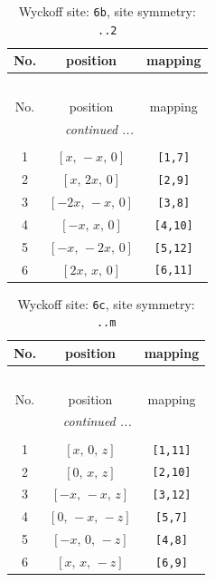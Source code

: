 \documentclass[fleqn,8pt]{jsarticle}
\begin{document}
\begin{longtable}{ccc}
\caption{Wyckoff site: {\tt 6b}, site symmetry: {\tt ..2}}
 \\
 \hline \hline
No. & position & mapping \\ \hline \endfirsthead

\multicolumn{2}{l}{\tablename\ \thetable{}} \\
 \hline \hline
No. & position & mapping \\ \hline \endhead

 \hline \hline
\multicolumn{2}{r}{\footnotesize\it continued ...} \\ \endfoot

 \hline \hline
\multicolumn{2}{r}{} \\ \endlastfoot

1 & $\left[ x,\, - x,\, 0 \right]$ & {\tt [1,7]} \\ \hline
2 & $\left[ x,\, 2 x,\, 0 \right]$ & {\tt [2,9]} \\ \hline
3 & $\left[ - 2 x,\, - x,\, 0 \right]$ & {\tt [3,8]} \\ \hline
4 & $\left[ - x,\, x,\, 0 \right]$ & {\tt [4,10]} \\ \hline
5 & $\left[ - x,\, - 2 x,\, 0 \right]$ & {\tt [5,12]} \\ \hline
6 & $\left[ 2 x,\, x,\, 0 \right]$ & {\tt [6,11]} \\
\end{longtable}
\renewcommand{\arraystretch}{1.2}
\begin{longtable}{ccc}
\caption{Wyckoff site: {\tt 6c}, site symmetry: {\tt ..m}}
 \\
 \hline \hline
No. & position & mapping \\ \hline \endfirsthead

\multicolumn{2}{l}{\tablename\ \thetable{}} \\
 \hline \hline
No. & position & mapping \\ \hline \endhead

 \hline \hline
\multicolumn{2}{r}{\footnotesize\it continued ...} \\ \endfoot

 \hline \hline
\multicolumn{2}{r}{} \\ \endlastfoot

1 & $\left[ x,\, 0,\, z \right]$ & {\tt [1,11]} \\ \hline
2 & $\left[ 0,\, x,\, z \right]$ & {\tt [2,10]} \\ \hline
3 & $\left[ - x,\, - x,\, z \right]$ & {\tt [3,12]} \\ \hline
4 & $\left[ 0,\, - x,\, - z \right]$ & {\tt [5,7]} \\ \hline
5 & $\left[ - x,\, 0,\, - z \right]$ & {\tt [4,8]} \\ \hline
6 & $\left[ x,\, x,\, - z \right]$ & {\tt [6,9]} \\
\end{longtable}
\end{document}
